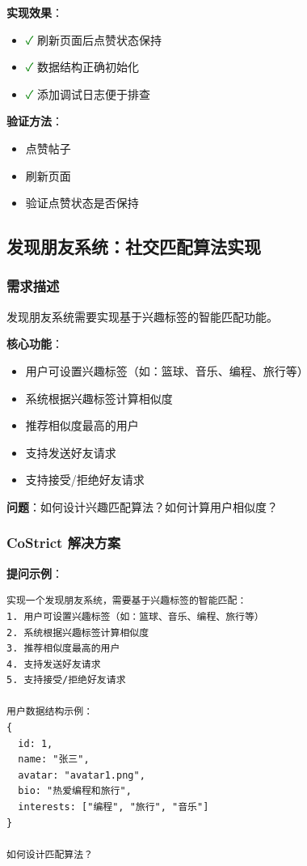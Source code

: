 \documentclass[12pt,a4paper]{article}
\begin{document}
\textbf{实现效果}：
\begin{itemize}
    \item \textcolor{green}{✓} 刷新页面后点赞状态保持
    \item \textcolor{green}{✓} 数据结构正确初始化
    \item \textcolor{green}{✓} 添加调试日志便于排查
\end{itemize}

\textbf{验证方法}：
\begin{itemize}
    \item 点赞帖子
    \item 刷新页面
    \item 验证点赞状态是否保持
\end{itemize}

\subsection{发现朋友系统：社交匹配算法实现}

\subsubsection{需求描述}

发现朋友系统需要实现基于兴趣标签的智能匹配功能。

\textbf{核心功能}：
\begin{itemize}
    \item 用户可设置兴趣标签（如：篮球、音乐、编程、旅行等）
    \item 系统根据兴趣标签计算相似度
    \item 推荐相似度最高的用户
    \item 支持发送好友请求
    \item 支持接受/拒绝好友请求
\end{itemize}

\textbf{问题}：如何设计兴趣匹配算法？如何计算用户相似度？

\subsubsection{CoStrict 解决方案}

\textbf{提问示例}：
\begin{verbatim}
实现一个发现朋友系统，需要基于兴趣标签的智能匹配：
1. 用户可设置兴趣标签（如：篮球、音乐、编程、旅行等）
2. 系统根据兴趣标签计算相似度
3. 推荐相似度最高的用户
4. 支持发送好友请求
5. 支持接受/拒绝好友请求

用户数据结构示例：
{
  id: 1,
  name: "张三",
  avatar: "avatar1.png",
  bio: "热爱编程和旅行",
  interests: ["编程", "旅行", "音乐"]
}

如何设计匹配算法？
\end{verbatim}
\end{document}
